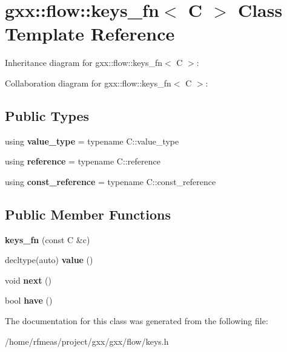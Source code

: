 \hypertarget{classgxx_1_1flow_1_1keys__fn}{}\section{gxx\+:\+:flow\+:\+:keys\+\_\+fn$<$ C $>$ Class Template Reference}
\label{classgxx_1_1flow_1_1keys__fn}


Inheritance diagram for gxx\+:\+:flow\+:\+:keys\+\_\+fn$<$ C $>$\+:


Collaboration diagram for gxx\+:\+:flow\+:\+:keys\+\_\+fn$<$ C $>$\+:
\subsection*{Public Types}
\begin{DoxyCompactItemize}
\item 
using {\bfseries value\+\_\+type} = typename C\+::value\+\_\+type\hypertarget{classgxx_1_1flow_1_1keys__fn_ab777168548f297736ca8bb30a38182e7}{}\label{classgxx_1_1flow_1_1keys__fn_ab777168548f297736ca8bb30a38182e7}

\item 
using {\bfseries reference} = typename C\+::reference\hypertarget{classgxx_1_1flow_1_1keys__fn_a2598a40907e37650f6ff8be2b0a896ae}{}\label{classgxx_1_1flow_1_1keys__fn_a2598a40907e37650f6ff8be2b0a896ae}

\item 
using {\bfseries const\+\_\+reference} = typename C\+::const\+\_\+reference\hypertarget{classgxx_1_1flow_1_1keys__fn_af218a237118c4c7186904ebbd5f65514}{}\label{classgxx_1_1flow_1_1keys__fn_af218a237118c4c7186904ebbd5f65514}

\end{DoxyCompactItemize}
\subsection*{Public Member Functions}
\begin{DoxyCompactItemize}
\item 
{\bfseries keys\+\_\+fn} (const C \&c)\hypertarget{classgxx_1_1flow_1_1keys__fn_aa9b8d2fbcb55fb0a73dea006f9a27b19}{}\label{classgxx_1_1flow_1_1keys__fn_aa9b8d2fbcb55fb0a73dea006f9a27b19}

\item 
decltype(auto) {\bfseries value} ()\hypertarget{classgxx_1_1flow_1_1keys__fn_a06d62869f7eb8a9fa34a60d2e8e8e0fe}{}\label{classgxx_1_1flow_1_1keys__fn_a06d62869f7eb8a9fa34a60d2e8e8e0fe}

\item 
void {\bfseries next} ()\hypertarget{classgxx_1_1flow_1_1keys__fn_ab603fe684baffcc9db4365cf0b9a9e80}{}\label{classgxx_1_1flow_1_1keys__fn_ab603fe684baffcc9db4365cf0b9a9e80}

\item 
bool {\bfseries have} ()\hypertarget{classgxx_1_1flow_1_1keys__fn_abaeeef17ca42e013101a163fd9d5b0d7}{}\label{classgxx_1_1flow_1_1keys__fn_abaeeef17ca42e013101a163fd9d5b0d7}

\end{DoxyCompactItemize}


The documentation for this class was generated from the following file\+:\begin{DoxyCompactItemize}
\item 
/home/rfmeas/project/gxx/gxx/flow/keys.\+h\end{DoxyCompactItemize}

